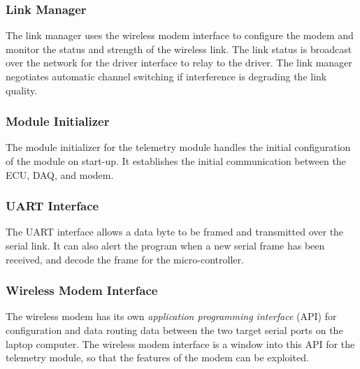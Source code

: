 \subsubsection{Link Manager}

The link manager uses the wireless modem interface to configure the modem and monitor the status and strength of the wireless link. The link status is broadcast over the network for the driver interface to relay to the driver. The link manager negotiates automatic channel switching if interference is degrading the link quality.

\subsubsection{Module Initializer}

The module initializer for the telemetry module handles the initial configuration of the module on start-up. It establishes the initial communication between the ECU, DAQ, and modem. 

\subsubsection{UART Interface}

The UART interface allows a data byte to be framed and transmitted over the serial link. It can also alert the program when a new serial frame has been received, and decode the frame for the micro-controller.

\subsubsection{Wireless Modem Interface}

The wireless modem has its own \emph{application programming interface} (API) for configuration and data routing data between the two target serial ports on the laptop computer. The wireless modem interface is a window into this API for the telemetry module, so that the features of the modem can be exploited.
